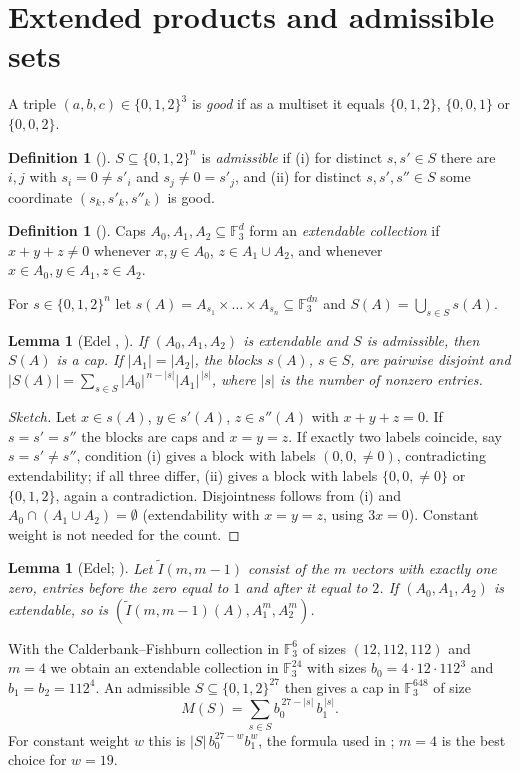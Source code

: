 \documentclass[11pt]{article}
\numberwithin{equation}{section}
\newtheorem{lemma}[theorem]{Lemma}
\theoremstyle{definition}
\newtheorem{definition}[theorem]{Definition}
\theoremstyle{remark}
\newcommand{\F}{\mathbb F}
\begin{document}
\section{Extended products and admissible sets}
A triple $(a,b,c)\in\{0,1,2\}^3$ is \emph{good} if as a multiset it equals $\{0,1,2\}$, $\{0,0,1\}$
or $\{0,0,2\}$.
\begin{definition}[{\cite[Def.~2.5]{Tyrrell}}]
$S\subseteq\{0,1,2\}^n$ is \emph{admissible} if (i) for distinct $s,s'\in S$ there are $i,j$ with
$s_i=0\ne s'_i$ and $s_j\ne0=s'_j$, and (ii) for distinct $s,s',s''\in S$ some coordinate
$(s_k,s'_k,s''_k)$ is good.
\end{definition}
\begin{definition}[{\cite[Def.~2.4]{Tyrrell}}]
Caps $A_0,A_1,A_2\subseteq\F_3^d$ form an \emph{extendable collection} if $x+y+z\ne0$ whenever
$x,y\in A_0$, $z\in A_1\cup A_2$, and whenever $x\in A_0,y\in A_1,z\in A_2$.
\end{definition}
For $s\in\{0,1,2\}^n$ let $s(A)=A_{s_1}\times\dots\times A_{s_n}\subseteq\F_3^{dn}$ and
$S(A)=\bigcup_{s\in S}s(A)$.
\begin{lemma}[Edel {\cite[Lemma 10]{Edel}}, {\cite[Lemmas 2.7, 2.11]{Tyrrell}}]\label{lem:ext}
If $(A_0,A_1,A_2)$ is extendable and $S$ is admissible, then $S(A)$ is a cap.  If $|A_1|=|A_2|$, the
blocks $s(A)$, $s\in S$, are pairwise disjoint and
$|S(A)|=\sum_{s\in S}|A_0|^{\,n-|s|}|A_1|^{\,|s|}$, where $|s|$ is the number of nonzero entries.
\end{lemma}
\begin{proof}[Sketch]
Let $x\in s(A)$, $y\in s'(A)$, $z\in s''(A)$ with $x+y+z=0$.  If $s=s'=s''$ the blocks are caps and
$x=y=z$.  If exactly two labels coincide, say $s=s'\ne s''$, condition (i) gives a block with labels
$(0,0,\ne0)$, contradicting extendability; if all three differ, (ii) gives a block with labels
$\{0,0,\ne 0\}$ or $\{0,1,2\}$, again a contradiction.  Disjointness follows from (i) and
$A_0\cap(A_1\cup A_2)=\emptyset$ (extendability with $x=y=z$, using $3x=0$).  Constant weight is not
needed for the count.
\end{proof}
\begin{lemma}[Edel; {\cite[Lemmas 2.9, 2.12]{Tyrrell}}]\label{lem:rec}
Let $\tilde I(m,m-1)$ consist of the $m$ vectors with exactly one zero, entries before the zero equal
to $1$ and after it equal to $2$.  If $(A_0,A_1,A_2)$ is extendable, so is
$(\tilde I(m,m-1)(A),A_1^m,A_2^m)$.
\end{lemma}
With the Calderbank--Fishburn collection in $\F_3^6$ of sizes $(12,112,112)$
\cite[Lemma 2.14]{Tyrrell} and $m=4$ we obtain an extendable collection in $\F_3^{24}$ with sizes
$b_0=4\cdot12\cdot112^3$ and $b_1=b_2=112^4$.  An admissible $S\subseteq\{0,1,2\}^{27}$ then gives a
cap in $\F_3^{648}$ of size
\begin{equation}\label{eq:size}
M(S)=\sum_{s\in S} b_0^{\,27-|s|}\,b_1^{\,|s|}.
\end{equation}
For constant weight $w$ this is $|S|\,b_0^{27-w}b_1^{w}$, the formula used in
\cite{FunSearch,Xevolve}; $m=4$ is the best choice for $w=19$.
\end{document}
